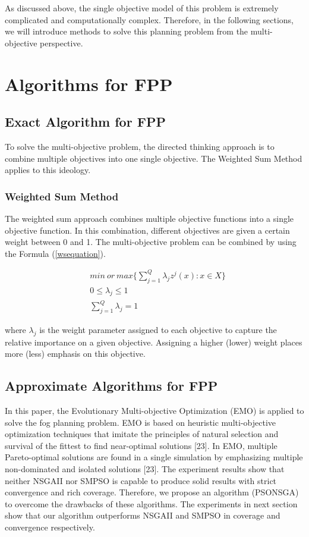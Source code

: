 \documentclass[10pt,journal,compsoc]{IEEEtran}
\newcommand{\Eq}[1]{(\ref{#1})}
\begin{document}
As discussed above, the single objective model of this problem is extremely complicated and computationally complex. Therefore, in the following sections, we will introduce methods to solve this planning problem from the multi-objective perspective.


\section{Algorithms for FPP}\label{alfpp}

\subsection{Exact Algorithm for FPP}
To solve the multi-objective problem, the directed thinking approach is to combine multiple objectives into one single objective. The Weighted Sum Method applies to this ideology.

\subsubsection{Weighted Sum Method}
The weighted sum approach combines multiple objective functions into a single objective function. In this combination, different objectives are given a certain weight between 0 and 1. The multi-objective problem can be combined by using the Formula \Eq{wsequation}.

\begin{align}
&min\ or\ max \bigg\{\sum_{j=1}^Q \lambda_j z^j (x) : x \in X \bigg\}\label{wsequation}\\
&0\leq \lambda_j \leq 1\\
&\sum_{j=1}^Q \lambda_j = 1
\end{align}

where $\lambda_j$ is the weight parameter assigned to each objective to capture the relative importance on a given objective. Assigning a higher (lower) weight places more (less) emphasis on this objective.

\subsection{Approximate Algorithms for FPP}\label{sec:approximate}
In this paper, the Evolutionary Multi-objective Optimization (EMO) is applied to solve the fog planning problem. EMO is based on heuristic multi-objective optimization techniques that imitate the principles of natural selection and survival of the fittest to find near-optimal solutions [23]. In EMO, multiple Pareto-optimal solutions are found in a single simulation by emphasizing multiple non-dominated and isolated solutions [23]. %
The experiment results show that neither NSGAII nor SMPSO is capable to produce solid results with strict convergence and rich coverage. Therefore, we propose an algorithm (PSONSGA) to overcome the drawbacks of these algorithms. The experiments in next section show that our algorithm outperforms NSGAII and SMPSO in coverage and convergence respectively.
\end{document}
